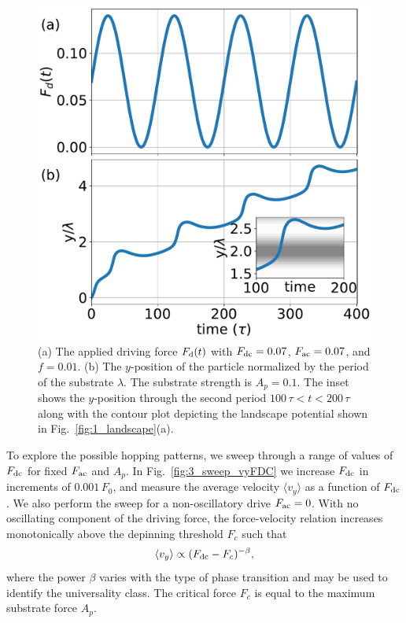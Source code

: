 \documentclass[preprint,showpacs,preprintnumbers,amsmath,amssymb,aps,prb]{revtex4-1}
\theoremstyle{remark}
\begin{document}
\begin{figure}[h]
\centering
\includegraphics[width=\columnwidth]{fig2_Fd_vy_time.pdf}
\caption{(a) The applied driving force $F_{\rm d}(t)$ 
  with  $F_{\rm dc} = 0.07$, $F_{\rm ac} = 0.07$, and $f=0.01$.
  (b) 
  The $y$-position of the  particle
  normalized by the period of the substrate $\lambda$.
  The substrate strength is $A_p=0.1$.
  The inset   shows
  the $y$-position
  through the second period $100\,\tau<t<200\,\tau$
 along with the contour plot depicting
  the landscape potential shown in Fig.~\ref{fig:1_landscape}(a).
  }
\label{fig:2_Fd_vy_time}
\end{figure}

To explore the possible hopping patterns,
we sweep through a range of values of $F_{\rm dc}$ for fixed $F_{\rm ac}$ and $A_p$.
In Fig.~\ref{fig:3_sweep_vyFDC} 
we increase $F_{\rm dc}$ in increments of $0.001\,F_0$,
and 
measure the average velocity $\langle v_y \rangle $ 
as a function of $F_{\rm dc}$.
We also perform the sweep for a non-oscillatory drive $F_{\rm ac} = 0$.
With no oscillating component of the driving force,
  the force-velocity relation increases monotonically 
  above the depinning threshold $F_c$ such that
  \begin{equation}
    \langle v_y \rangle \propto (F_{\rm dc}-F_c)^{-\beta},
  \end{equation}
  where the power $\beta$ varies with the
  type of phase transition and 
  may 
  be used to identify the universality class.\cite{Reichhardt2017} 
  The critical force $F_c$ is equal to the maximum substrate force
  $A_p$.
 
\end{document}
